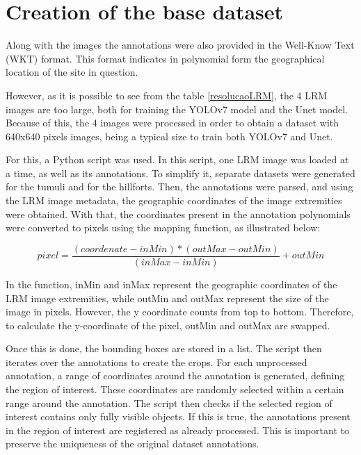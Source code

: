 
\section{Creation of the base dataset}

Along with the images the annotations were also provided in the Well-Know Text (WKT) format. This format indicates in polynomial form the geographical location of the site in question.

However, as it is possible to see from the table \ref{resolucaoLRM}, the 4 LRM images are too large, both for training the YOLOv7 model and the Unet model. Because of this, the 4 images were processed in order to obtain a dataset with 640x640 pixels images, being a typical size to train both YOLOv7 and Unet.

For this, a Python script was used. In this script, one LRM image was loaded at a time, as well as its annotations. To simplify it, separate datasets were generated for the tumuli and for the hillforts. Then, the annotations were parsed, and using the LRM image metadata, the geographic coordinates of the image extremities were obtained. With that, the coordinates present in the annotation polynomials were converted to pixels using the mapping function, as illustrated below:

\begin{equation}
     pixel = \frac{(coordenate - inMin) * (outMax - outMin)} {(inMax - inMin)} + outMin
     \label{Map function}
\end{equation}

In the function, inMin and inMax represent the geographic coordinates of the LRM image extremities, while outMin and outMax represent the size of the image in pixels. However, the y coordinate counts from top to bottom. Therefore, to calculate the y-coordinate of the pixel, outMin and outMax are swapped.

Once this is done, the bounding boxes are stored in a list. The script then iterates over the annotations to create the crops. For each unprocessed annotation, a range of coordinates around the annotation is generated, defining the region of interest. These coordinates are randomly selected within a certain range around the annotation. The script then checks if the selected region of interest contains only fully visible objects. If this is true, the annotations present in the region of interest are registered as already processed. This is important to preserve the uniqueness of the original dataset annotations. 

